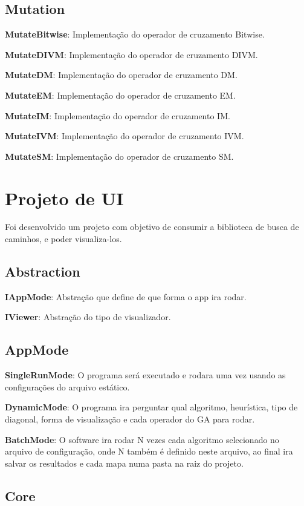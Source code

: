 \subsection{Mutation}
\textbf{MutateBitwise}: Implementação do operador de cruzamento Bitwise.

\textbf{MutateDIVM}: Implementação do operador de cruzamento DIVM.

\textbf{MutateDM}: Implementação do operador de cruzamento DM.

\textbf{MutateEM}: Implementação do operador de cruzamento EM.

\textbf{MutateIM}: Implementação do operador de cruzamento IM.

\textbf{MutateIVM}: Implementação do operador de cruzamento IVM.

\textbf{MutateSM}: Implementação do operador de cruzamento SM.


\section{Projeto de UI}

Foi desenvolvido um projeto com objetivo de consumir a biblioteca de busca de caminhos, e poder visualiza-los.

\subsection{Abstraction}
\textbf{IAppMode}: Abstração que define de que forma o app ira rodar.

\textbf{IViewer}: Abstração do tipo de visualizador.

\subsection{AppMode}
\textbf{SingleRunMode}: O programa será executado e rodara uma vez usando as configurações do arquivo estático.

\textbf{DynamicMode}: O programa ira perguntar qual algoritmo, heurística, tipo de diagonal, forma de visualização e cada operador do GA para rodar.

\textbf{BatchMode}: O software ira rodar N vezes cada algoritmo selecionado no arquivo de configuração, onde N também é definido neste arquivo, ao final ira salvar os resultados e cada mapa numa pasta na raiz do projeto.


\subsection{Core}

